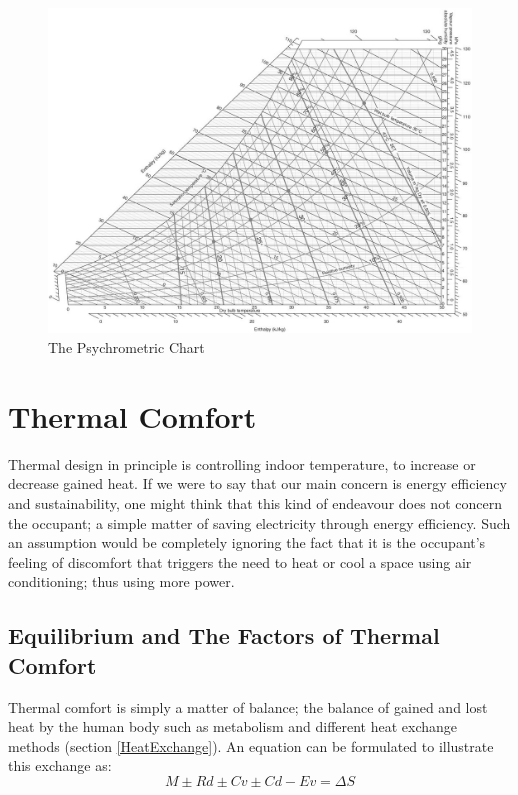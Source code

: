 \documentclass[a4paper,twoside,12pt,openright,final,oldfontcommands]{memoir}
\begin{document}
\begin{figure}[htbp] %
\centering
\includegraphics[width=17cm,angle=90]{./Images/1-PsychrometricChart}
\caption[The Psychrometiric Chart]{The Psychrometric Chart \cite{szokolay08} \label{PsychroChart}}
\end{figure}

\newpage
\section{Thermal Comfort}
Thermal design in principle is controlling indoor temperature, to increase or decrease gained heat.
If we were to say that our main concern is energy efficiency and sustainability, one might think
that this kind of endeavour does not concern the occupant; a simple matter of saving electricity
through energy efficiency. Such an assumption would be completely ignoring the fact that it is the
occupant's feeling of discomfort that triggers the need to heat or cool a space using air
conditioning; thus using more power.
\subsection{Equilibrium and The Factors of Thermal Comfort}
Thermal comfort is simply a matter of balance; the balance of gained and lost heat by the human
body such as metabolism and different heat exchange methods (section \ref{HeatExchange}). An
equation can be formulated to illustrate this exchange as:
\begin{equation}
M \pm Rd \pm Cv \pm Cd - Ev = \Delta S
\label{StoredHeat}
\end{equation}
\end{document}

